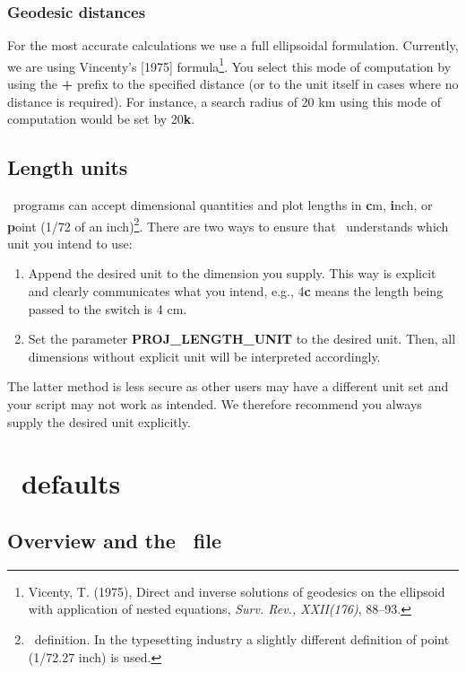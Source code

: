 \subsubsection{Geodesic distances}
For the most accurate calculations we use a full ellipsoidal formulation.  Currently,
we are using Vincenty's [1975] formula\footnote{Vicenty, T. (1975), Direct and inverse solutions
of geodesics on the ellipsoid with application of nested equations, {\it Surv. Rev., XXII(176)}, 88–93.}.
You select this mode of computation by using the \textbf{+} prefix to
the specified distance (or to the unit itself in cases where no distance is required).
For instance, a search radius of 20 km using this mode of computation would be set by 20\textbf{k}.

\subsection{Length units}

\GMT\ programs can accept dimensional quantities and plot lengths
in \textbf{c}m, \textbf{i}nch,
or \textbf{p}oint (1/72 of an inch)\footnote{\PS\ definition.
In the typesetting industry a slightly different definition of point
(1/72.27 inch) is used.}.  There are two ways to ensure that \GMT\ understands
which unit you intend to use:

\begin{enumerate}
\item Append the desired unit to the dimension you supply.  This
way is explicit and clearly communicates what you intend, e.g.,
4\textbf{c} means the length being passed to the  switch is 4 cm.

\item Set the parameter \textbf{PROJ\_LENGTH\_UNIT} to the desired unit.  Then, all
dimensions without explicit unit will be interpreted accordingly.

\end{enumerate}
The latter method is less secure as other users may have a different unit
set and your script may not work as intended.  We therefore recommend
you always supply the desired unit explicitly.

\section{\gmt\ defaults}
\label{sec:gmt.conf}
\subsection{Overview and the \protect{}\ file}

